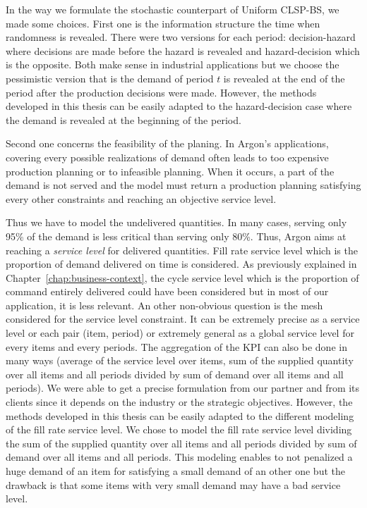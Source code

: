 In the way we formulate the stochastic counterpart of Uniform CLSP-BS, we made some choices. First one is the information structure \ie the time when randomness is revealed. There were two versions for each period: decision-hazard where decisions are made before the hazard is revealed and hazard-decision which is the opposite. Both make sense in industrial applications but we choose the pessimistic version that is the demand of period $t$ is revealed at the end of the period after the production decisions were made. However, the methods developed in this thesis can be easily adapted to the hazard-decision case where the demand is revealed at the beginning of the period.


Second one concerns the feasibility of the planing. In Argon's applications, covering every possible realizations of demand often leads to too expensive production planning or to infeasible planning. When it occurs, a part of the demand is not served and the model must return a production planning satisfying every other constraints and reaching an objective service level.


Thus we have to model the undelivered quantities. In many cases, serving only 95\% of the demand is less critical than serving only 80\%. Thus, Argon aims at reaching a \emph{service level} for delivered quantities. Fill rate service level which is the proportion of demand delivered on time is considered. As previously explained in Chapter~\ref{chap:business-context}, the cycle service level which is the proportion of command entirely delivered could have been considered but in most of our application, it is less relevant. An other non-obvious question is the mesh considered for the service level constraint. It can be extremely precise as a service level or each pair (item, period) or extremely general as a global service level for every items and every periods. The aggregation of the KPI can also be done in many ways (\eg average of the service level over items, sum of the supplied quantity over all items and all periods divided by sum of demand over all items and all periods). We were able to get a precise formulation from our partner and from its clients since it depends on the industry or the strategic objectives. However, the methods developed in this thesis can be easily adapted to the different modeling of the fill rate service level. We chose to model the fill rate service level dividing the sum of the supplied quantity over all items and all periods divided by sum of demand over all items and all periods. This modeling enables to not penalized a huge demand of an item for satisfying a small demand of an other one but the drawback is that some items with very small demand may have a bad service level.


